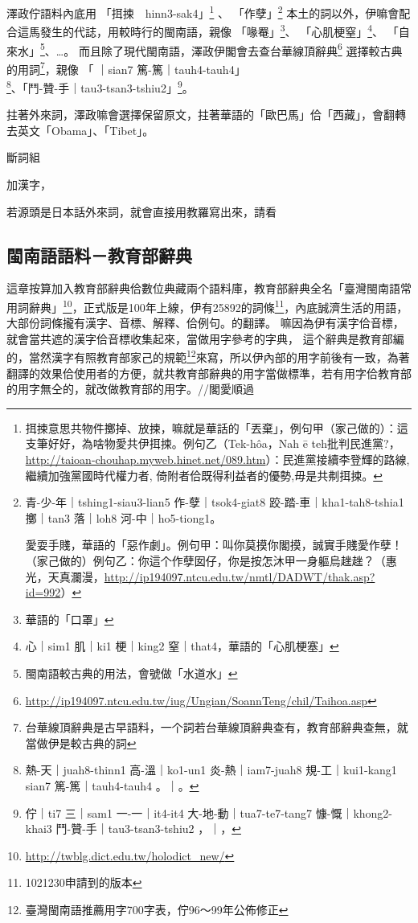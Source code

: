 \documentclass[final,oneside,onecolumn,12pt,a4paper]{book}%
\begin{document}
澤政佇語料內底用
「挕捒　hinn3-sak4」\footnote{挕捒意思共物件擲掉、放捒，嘛就是華話的「丟棄」，例句甲（家己做的）：這支筆好好，為啥物愛共伊挕捒。例句乙（Tek-hôa，Nah ē teh批判民進黨?，\url{http://taioan-chouhap.myweb.hinet.net/089.htm}）：民進黨接續李登輝的路線, 繼續加強黨國時代權力者, 倚附者佮既得利益者的優勢,毋是共刜挕捒。}
、
「作孽」\footnote{
青-少-年｜tshing1-siau3-lian5 作-孽｜tsok4-giat8 跤-踏-車｜kha1-tah8-tshia1 擲｜tan3 落｜loh8 河-中｜ho5-tiong1。

愛耍手賤，華語的「惡作劇」。例句甲：叫你莫摸你閣摸，誠實手賤愛作孽！（家己做的）例句乙：你這个作孽囡仔，你是按怎沐甲一身軀烏趖趖？（惠光，天真瀾漫，\url{http://ip194097.ntcu.edu.tw/nmtl/DADWT/thak.asp?id=992}）}
本土的詞以外，伊嘛會配合這馬發生的代誌，用較時行的閩南語，親像
「喙罨」\footnote{華語的「口罩」}、
「心肌梗窒」\footnote{心｜sim1 肌｜ki1 梗｜king2 窒｜that4，華語的「心肌梗塞」}、
「自來水」\footnote{閩南語較古典的用法，會號做「水道水」}、…。
而且除了現代閩南語，澤政伊閣會去查台華線頂辭典\footnote{\url{http://ip194097.ntcu.edu.tw/iug/Ungian/SoannTeng/chil/Taihoa.asp}}
選擇較古典的用詞\footnote{台華線頂辭典是古早語料，一个詞若台華線頂辭典查有，教育部辭典查無，就當做伊是較古典的詞}，親像
「𤺪｜sian7 篤-篤｜tauh4-tauh4」\footnote{熱-天｜juah8-thinn1 高-溫｜ko1-un1 炎-熱｜iam7-juah8 規-工｜kui1-kang1 𤺪｜sian7 篤-篤｜tauh4-tauh4 。｜。}、「鬥-贊-手｜tau3-tsan3-tshiu2」\footnote{佇｜ti7 三｜sam1 一-一｜it4-it4 大-地-動｜tua7-te7-tang7 慷-慨｜khong2-khai3 鬥-贊-手｜tau3-tsan3-tshiu2 ，｜，}。

拄著外來詞，澤政嘛會選擇保留原文，拄著華語的「歐巴馬」佮「西藏」，會翻轉去英文「Obama」、「Tibet」。

斷詞組

加漢字，

若源頭是日本話外來詞，就會直接用教羅寫出來，請看

\subsection{閩南語語料－教育部辭典}
\label{節：教育部辭典}
這章按算加入教育部辭典佮數位典藏兩个語料庫，教育部辭典全名「臺灣閩南語常用詞辭典」\footnote{\url{http://twblg.dict.edu.tw/holodict_new/}}，正式版是100年上線，伊有25892的詞條\footnote{1021230申請到的版本}，內底誠濟生活的用語，大部份詞條攏有漢字、音標、解釋、佮例句。的翻譯。
嘛因為伊有漢字佮音標，就會當共遮的漢字佮音標收集起來，當做用字參考的字典，
這个辭典是教育部編的，當然漢字有照教育部家己的規範\footnote{臺灣閩南語推薦用字700字表，佇96～99年公佈修正}來寫，所以伊內部的用字前後有一致，為著翻譯的效果佮使用者的方便，就共教育部辭典的用字當做標準，若有用字佮教育部的用字無仝的，就改做教育部的用字。//閣愛順過
\end{document}
